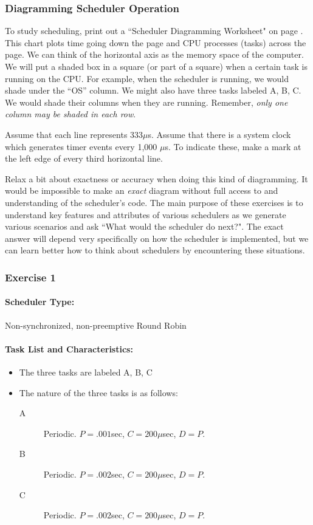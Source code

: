 \documentclass{article}	%
\begin{document}
\subsubsection*{Diagramming Scheduler Operation}
To study scheduling, print out a ``Scheduler Diagramming Worksheet"
 on page \pageref{SchedWorksheet}.	%
This chart plots time going down the page and CPU
processes (tasks) across the page. We can think of the horizontal axis
as the memory space of the computer. We will put a shaded box in a
square (or part of a square) when a certain task is running on the CPU.
For example, when the scheduler is running, we would shade under the
``OS'' column. We might also have three tasks labeled A, B, C. We would
shade their columns when they are running. Remember, {\em only one column
may be shaded in each row}.

Assume that each line represents 333$\mu$s.   Assume that there is
a system clock which generates timer events every 1,000 $\mu$s.
To indicate these, make a mark at the left edge of every third
horizontal line.

Relax a bit about exactness or accuracy when doing this kind of diagramming. 
It would be impossible to make an {\it exact} diagram without full access to 
and understanding of the scheduler's code.   The main purpose of these exercises
is to understand key features and attributes of various schedulers as we
generate various scenarios and ask ``What would the scheduler do next?".  
The exact answer will depend very specifically on how the scheduler is 
implemented,  but we
can learn better how to think about schedulers by encountering these situations. 

\subsubsection{Exercise 1}\label{SchEx1}

\paragraph{Scheduler Type:} Non-synchronized, non-preemptive Round Robin
\paragraph{Task List and Characteristics:} 

\begin{itemize}
\item The three tasks are labeled A, B, C
\item The nature of the three tasks is as follows:
    \begin{description}
      \item [A] Periodic. $P = .001$sec, $C = 200\mu$sec, $D =P$.
      \item [B] Periodic. $P = .002$sec, $C = 200\mu$sec, $D =P$.
      \item [C] Periodic. $P = .002$sec, $C = 200\mu$sec, $D =P$.
    \end{description}
\end{itemize}
\end{document}
